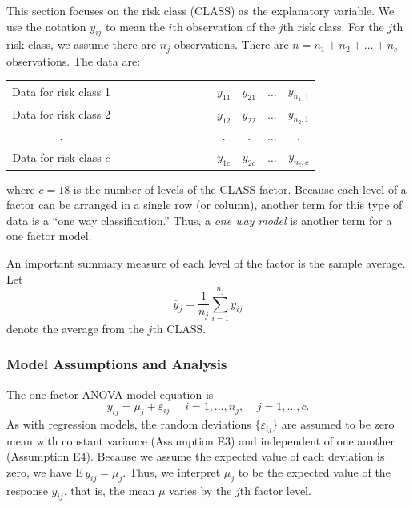 \linejed


This section focuses on the risk class (CLASS) as
the explanatory variable. We use the notation $y_{ij}$ to mean
the $i$th observation of the $j$th risk class. For the $j$th risk class, we assume
there are $n_j$ observations. There are $n=n_1+n_2+\ldots +n_c$
observations. The data are:

\begin{center}
\begin{tabular}{cccccc}
Data for risk class 1 & \ \ \ \ \ \ \ \ \ \ \ \ \ \ \  & $y_{11}$ & $y_{21}$ & $%
\ldots $ & $y_{n_1,1}$ \\
Data for risk class 2 &  & $y_{12}$ & $y_{22}$ & $\ldots $ & $y_{n_2,1}$ \\
. &  & $.$ & $.$ & $\ldots$ & $.$ \\
Data for risk class $c$ &  & $y_{1c}$ & $y_{2c}$ & $\ldots $ & $y_{n_c,c}$%
\end{tabular}
\end{center}

\noindent where $c=18$ is the number of levels of the CLASS factor.
Because each level of a factor can be arranged in a single row (or
column), another term for this type of data is a ``one way
classification.'' Thus, a \textit{one way model} is another term for
a one factor model.

An important summary measure of each level of the factor is the sample
average. Let
\begin{equation*}
\overline{y}_j=\frac{1}{n_j}\sum_{i=1}^{n_j}y_{ij}
\end{equation*}
denote the average from the $j$th CLASS.

\subsubsection*{Model Assumptions and Analysis}

The one factor ANOVA model equation is
\begin{equation}\label{E4:OneFactorEquation}
y_{ij}=\mu_j+ \varepsilon_{ij}\ \ \ \ \ \ i=1,\ldots ,n_j,\ \ \ \ \
j=1,\ldots ,c.
\end{equation}
As with regression models, the random deviations $\{
\varepsilon_{ij} \}$ are assumed to be zero mean with constant
variance (Assumption E3) and independent of one another (Assumption
E4). Because we assume the expected value of each deviation is zero,
we have E$\,y_{ij}=\mu_j$. Thus, we interpret $\mu_j$ to be the
expected value of the response $y_{ij}$, that is, the mean $\mu$
varies by the $j$th factor level.


